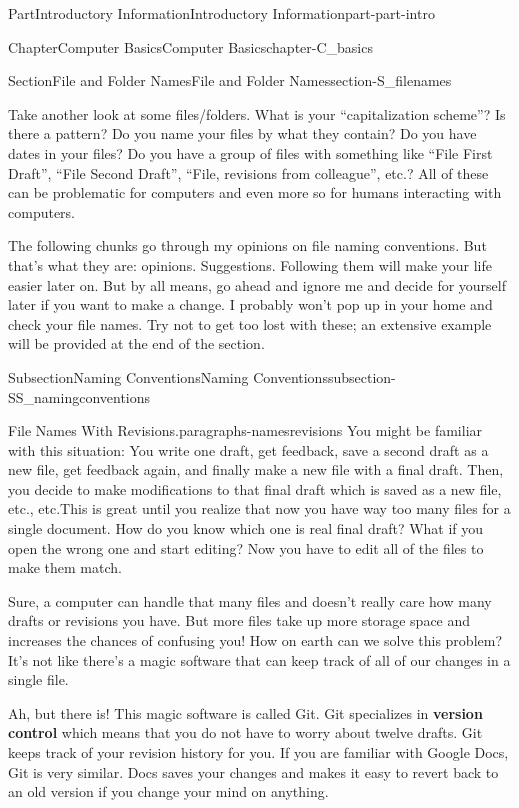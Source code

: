 \documentclass[twoside,10pt,]{book}
\newcommand{\terminology}[1]{\textbf{#1}}
\begin{document}
\begin{partptx}{Part}{Introductory Information}{}{Introductory Information}{}{}{part-part-intro}
\begin{chapterptx}{Chapter}{Computer Basics}{}{Computer Basics}{}{}{chapter-C_basics}
\begin{sectionptx}{Section}{File and Folder Names}{}{File and Folder Names}{}{}{section-S_filenames}
\begin{introduction}{}
\par
Take another look at some files\slash{}folders. What is your ``capitalization scheme''? Is there a pattern? Do you name your files by what they contain? Do you have dates in your files? Do you have a group of files with something like ``File First Draft'', ``File Second Draft'', ``File, revisions from colleague'', etc.? All of these can be problematic for computers and even more so for humans interacting with computers.%
\par
The following chunks go through my opinions on file naming conventions. But that's what they are: opinions. Suggestions. Following them will make your life easier later on. But by all means, go ahead and ignore me and decide for yourself later if you want to make a change. I probably won't pop up in your home and check your file names. Try not to get too lost with these; an extensive example will be provided at the end of the section.%
\end{introduction}%
%
%
\typeout{************************************************}
\typeout{************************************************}
%
\begin{subsectionptx}{Subsection}{Naming Conventions}{}{Naming Conventions}{}{}{subsection-SS_namingconventions}
\begin{paragraphs}{File Names With Revisions.}{paragraphs-namesrevisions}%
%
%
You might be familiar with this situation: You write one draft, get feedback, save a second draft as a new file, get feedback again, and finally make a new file with a final draft. Then, you decide to make modifications to that final draft which is saved as a new file, etc., etc.This is great until you realize that now you have way too many files for a single document. How do you know which one is real final draft? What if you open the wrong one and start editing? Now you have to edit all of the files to make them match.%
\par
Sure, a computer can handle that many files and doesn't really care how many drafts or revisions you have. But more files take up more storage space and increases the chances of confusing you! How on earth can we solve this problem? It's not like there's a magic software that can keep track of all of our changes in a single file.%
\par
Ah, but there is! This magic software is called Git. Git specializes in \terminology{version control} which means that you do not have to worry about twelve drafts. Git keeps track of your revision history for you. If you are familiar with Google Docs, Git is very similar. Docs saves your changes and makes it easy to revert back to an old version if you change your mind on anything.%

\end{paragraphs}
\end{subsectionptx}
\end{sectionptx}
\end{chapterptx}
\end{partptx}
\end{document}
